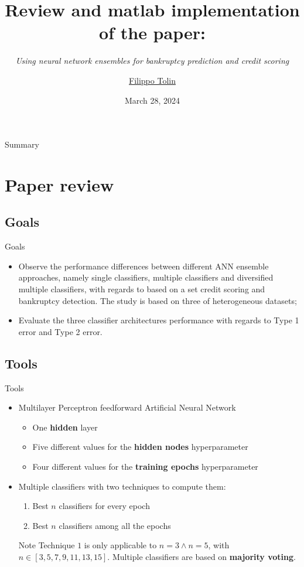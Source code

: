 \documentclass[12pt]{beamer}
\title[EM2091]{Review and matlab implementation of the paper:} %
\subtitle{\textit{Using neural network ensembles for bankruptcy prediction and credit scoring}}
\author[Filippo Tolin]{
    \href{mailto:874631@stud.unive.it}{Filippo Tolin}
}
\institute[Ca' Foscari]{Ca' Foscari University of Venice }
\date{March 28, 2024}
\begin{document}
\begin{frame}
\titlepage
\end{frame}

\begin{frame}{Summary}
\tableofcontents 
\end{frame}

\section{Paper review}

\subsection{Goals}

\begin{frame}{Goals}
  \begin{itemize}
    \item Observe the performance differences between different ANN ensemble
      approaches, namely single classifiers,
      multiple classifiers and diversified multiple classifiers, with regards to based on a set
      credit scoring and bankruptcy detection. The study is based on three
      of heterogeneous datasets;
    \item Evaluate the three classifier architectures performance with regards to
      Type 1 error and Type 2 error.
  \end{itemize}
\end{frame}

\subsection{Tools}

\begin{frame}{Tools}
  \begin{itemize}
    \item Multilayer Perceptron feedforward Artificial Neural Network
      \begin{itemize}
        \item One \textbf{hidden} layer
        \item Five different values for the \textbf{hidden nodes} hyperparameter
        \item Four different values for the \textbf{training epochs} hyperparameter
      \end{itemize}
    \item Multiple classifiers with two techniques to compute them:
      \begin{enumerate}
        \item Best $n$ classifiers for every epoch
        \item Best $n$ classifiers among all the epochs
      \end{enumerate}
      \begin{block}{Note}
        Technique $1$ is only applicable to $n=3 \wedge n=5$,
        with $n \in [3,5,7,9,11,13,15]$. Multiple classifiers are based on \textbf{majority voting}.
      \end{block}
  \end{itemize}
\end{frame}
\end{document}
